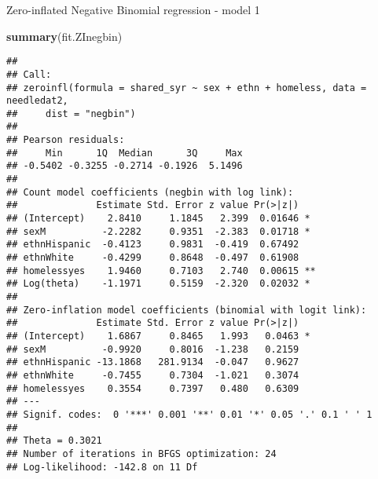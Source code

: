 \documentclass[
  ignorenonframetext,
]{beamer}
\newenvironment{Shaded}{\begin{snugshade}}{\end{snugshade}}
\newcommand{\KeywordTok}[1]{\textcolor[rgb]{0.13,0.29,0.53}{\textbf{#1}}}
\newcommand{\NormalTok}[1]{#1}
\begin{document}
\begin{frame}[fragile]{Zero-inflated Negative Binomial regression -
model 1}
\protect\hypertarget{zero-inflated-negative-binomial-regression---model-1}{}

\tiny

\begin{Shaded}
\begin{Highlighting}[]
\KeywordTok{summary}\NormalTok{(fit.ZInegbin)}
\end{Highlighting}
\end{Shaded}

\begin{verbatim}
## 
## Call:
## zeroinfl(formula = shared_syr ~ sex + ethn + homeless, data = needledat2, 
##     dist = "negbin")
## 
## Pearson residuals:
##     Min      1Q  Median      3Q     Max 
## -0.5402 -0.3255 -0.2714 -0.1926  5.1496 
## 
## Count model coefficients (negbin with log link):
##              Estimate Std. Error z value Pr(>|z|)   
## (Intercept)    2.8410     1.1845   2.399  0.01646 * 
## sexM          -2.2282     0.9351  -2.383  0.01718 * 
## ethnHispanic  -0.4123     0.9831  -0.419  0.67492   
## ethnWhite     -0.4299     0.8648  -0.497  0.61908   
## homelessyes    1.9460     0.7103   2.740  0.00615 **
## Log(theta)    -1.1971     0.5159  -2.320  0.02032 * 
## 
## Zero-inflation model coefficients (binomial with logit link):
##              Estimate Std. Error z value Pr(>|z|)  
## (Intercept)    1.6867     0.8465   1.993   0.0463 *
## sexM          -0.9920     0.8016  -1.238   0.2159  
## ethnHispanic -13.1868   281.9134  -0.047   0.9627  
## ethnWhite     -0.7455     0.7304  -1.021   0.3074  
## homelessyes    0.3554     0.7397   0.480   0.6309  
## ---
## Signif. codes:  0 '***' 0.001 '**' 0.01 '*' 0.05 '.' 0.1 ' ' 1 
## 
## Theta = 0.3021 
## Number of iterations in BFGS optimization: 24 
## Log-likelihood: -142.8 on 11 Df
\end{verbatim}

\end{frame}
\end{document}
